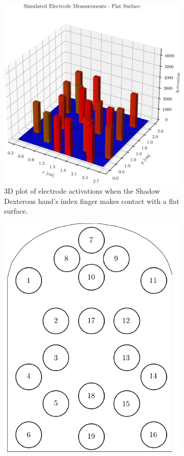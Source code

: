 \begin{figure}[h]
	\centering
	\begin{subfigure}[b]{0.48\textwidth}
		\centering
		\includegraphics[width=\textwidth]{chapters/1-tactile-perception/fig/pressure-distribution-crop.pdf}
		\caption{3D plot of electrode activations when the Shadow Dexterous hand's index finger makes contact with a flat surface.}
		\label{fig:simulated-electrode-distribution}
	\end{subfigure}
	\hfill
	\begin{subfigure}[b]{0.48\textwidth}
		\centering
		\includegraphics[height=\textwidth]{chapters/1-tactile-perception/fig/electrode-map.pdf}

\end{subfigure}
\end{figure}
